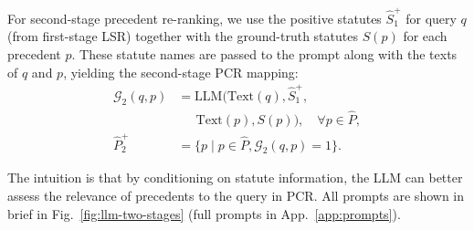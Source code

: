 \noindent For second-stage precedent re-ranking, we use the positive statutes $\hat S_1^+$ for query $q$ (from first-stage LSR) together with the ground-truth statutes $S(p)$ for each precedent $p$. These statute names are passed to the prompt along with the texts of $q$ and $p$, yielding the second-stage PCR mapping:
\vspace{-2mm}
\begin{align*}
\mathcal G_2(q,p) &= \textrm{LLM}\big(\textrm{Text}(q), \hat S_1^+, \nonumber \\
&\quad\ \ \textrm{Text}(p), S(p)\big), \quad \forall p \in \hat P, \\
\hat P_2^+ &= \{p \mid p \in \hat P, \mathcal G_2(q,p)=1\}.
\end{align*}

\vspace{-2mm}
\noindent The intuition is that by conditioning on statute information, the LLM can better assess the relevance of precedents to the query in PCR.
All prompts are shown in brief in Fig.~\ref{fig:llm-two-stages} (full prompts in App.~\ref{app:prompts}).


